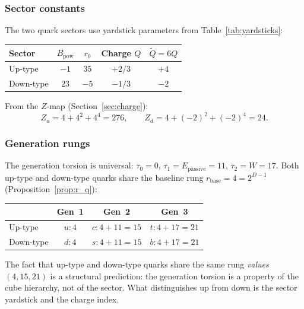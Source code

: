 \documentclass[11pt,a4paper]{article}
\theoremstyle{definition}
\theoremstyle{remark}
\newcommand{\Epass}{E_{\mathrm{passive}}}
\newcommand{\tildeQ}{\tilde{Q}}
\newcommand{\Zidx}{Z}
\begin{document}
\subsubsection{Sector constants}

The two quark sectors use yardstick parameters from
Table~\ref{tab:yardsticks}:

\begin{center}
\begin{tabular}{lcccc}
\toprule
Sector & $B_{\mathrm{pow}}$ & $r_0$ & Charge $Q$ &
  $\tildeQ = 6Q$ \\
\midrule
Up-type   & $-1$ & $35$ & $+2/3$ & $+4$ \\
Down-type & $23$ & $-5$ & $-1/3$ & $-2$ \\
\bottomrule
\end{tabular}
\end{center}

From the $\Zidx$-map (Section~\ref{sec:charge}):
\begin{equation}
  \Zidx_u = 4 + 4^2 + 4^4 = 276,
  \qquad
  \Zidx_d = 4 + (-2)^2 + (-2)^4 = 24.
  \label{eq:Z_quarks}
\end{equation}

\subsubsection{Generation rungs}

The generation torsion is universal: $\tau_0 = 0$, $\tau_1 = \Epass = 11$,
$\tau_2 = W = 17$.  Both up-type and down-type quarks share the baseline
rung $r_{\mathrm{base}} = 4 = 2^{D-1}$ (Proposition~\ref{prop:r_q}):

\begin{center}
\begin{tabular}{lccc}
\toprule
& Gen~1 & Gen~2 & Gen~3 \\
\midrule
Up-type   & $u: 4$ & $c: 4 + 11 = 15$ & $t: 4 + 17 = 21$ \\
Down-type & $d: 4$ & $s: 4 + 11 = 15$ & $b: 4 + 17 = 21$ \\
\bottomrule
\end{tabular}
\end{center}

\noindent
The fact that up-type and down-type quarks share the same rung
\emph{values} $(4, 15, 21)$ is a structural prediction: the generation
torsion is a property of the cube hierarchy, not of the sector.  What
distinguishes up from down is the sector yardstick and the charge index.
\end{document}
